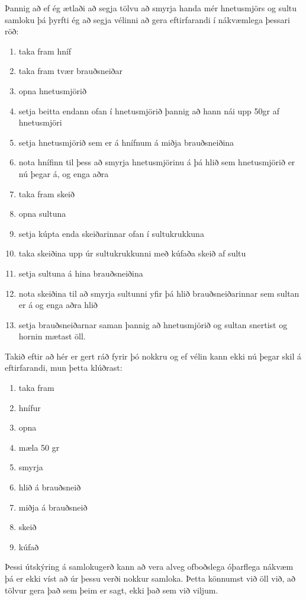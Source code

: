 Þannig að ef ég ætlaði að segja tölvu að smyrja handa mér hnetusmjörs og sultu samloku þá þyrfti ég að segja vélinni að gera eftirfarandi í nákvæmlega þessari röð:
\vspace{0.4cm}
\begin{enumerate}
	\item taka fram hníf
	\item taka fram tvær brauðsneiðar
	\item opna hnetusmjörið
	\item setja beitta endann ofan í hnetusmjörið þannig að hann nái upp 50gr af hnetusmjöri
	\item setja hnetusmjörið sem er á hnífnum á miðja brauðsneiðina
	\item nota hnífinn til þess að smyrja hnetusmjörinu á þá hlið sem hnetusmjörið er nú þegar á, og enga aðra
	\item taka fram skeið
	\item opna sultuna
	\item setja kúpta enda skeiðarinnar ofan í sultukrukkuna 
	\item taka skeiðina upp úr sultukrukkunni með kúfaða skeið af sultu
	\item setja sultuna á hina brauðsneiðina
	\item nota skeiðina til að smyrja sultunni yfir þá hlið brauðsneiðarinnar sem sultan er á og enga aðra hlið
	\item  setja brauðsneiðarnar saman þannig að hnetusmjörið og sultan snertist og hornin mætast öll. 
\end{enumerate} 
\vspace{0.4cm}
Takið eftir að hér er gert ráð fyrir þó nokkru og ef vélin kann ekki nú þegar skil á eftirfarandi, mun þetta klúðrast: 
\vspace{0.2cm}
\begin{enumerate}
	\item taka fram
	\item hnífur
	\item opna
	\item mæla 50 gr
	\item smyrja
	\item hlið á brauðsneið
	\item miðja á brauðsneið
	\item skeið
	\item kúfað
\end{enumerate} 
\vspace{0.2cm}

Þessi útskýring á samlokugerð kann að vera alveg ofboðslega óþarflega nákvæm þá er ekki víst að úr þessu verði nokkur samloka.
Þetta könnumst við öll við, að tölvur gera það sem þeim er sagt, ekki það sem við viljum.

